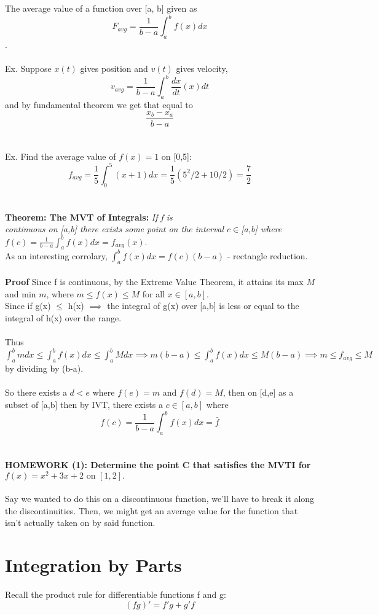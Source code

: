 \documentclass[twocolumn, 12pt]{report}
\begin{document}
  The average value of a function over [a, b] given as $$F_{avg} = \frac {1}{b-a} \int_a^b f(x)dx$$.\\\\ Ex. Suppose $x(t)$ gives position and $v(t)$ gives velocity, $$v_{avg} = \frac{1}{b-a} \int_a^b \frac{dx}{dt}(x) dt$$ and by fundamental theorem we get that equal to $$\frac{x_b-x_a}{b-a}$$ \\\\
  Ex. Find the average value of $f(x) = 1$ on [0,5]:
  $$f_{avg} = \frac{1}{5} \int_0^5 (x+1) dx = \frac{1}{5} (5^2/2 + 10/2) = \frac{7}{2}$$ \\\\
  \textbf{Theorem: The MVT of Integrals:} \textit{ If f is \\continuous on [a,b] there exists some point on the interval $c\in$[a,b] where $f(c) = \frac{1}{b-a} \int_a^b f(x)dx = f_{avg}(x)$}. \\ As an interesting corrolary, $\int_a^b f(x)dx = f(c)(b-a)$ - rectangle reduction.
  \\\\
  \textbf{Proof} Since f is continuous, by the Extreme Value Theorem, it attains its max $M$ and min $m$, where $ m \leq f(x) \leq M$ for all $x \in [a,b]$. \\ Since if g(x) $\leq$ h(x) $\implies$ the integral of g(x) over [a,b] is less or equal to the integral of h(x) over the range. \\\\Thus $\int_a^b m dx \leq \int_a^b f(x) dx \leq \int_a^b M dx \implies m(b-a) \leq \int_a^b f(x) dx \leq M (b-a) \implies m \leq f_{avg} \leq M$ by dividing by (b-a). \\\\
  So there exists a $d < e$ where $f(e) = m$ and $f(d) = M$, then on [d,e] as a subset of [a,b] then by IVT, there exists a $c \in [a,b]$ where $$f(c) = \frac{1}{b-a}\int_a^b f(x)dx = \bar{f}$$\\\\

   \textbf{HOMEWORK (1): Determine the point C that satisfies the MVTI for $f(x) = x^2 + 3x + 2 \text{ on } [1,2].$}\\\\ Say we wanted to do this on a discontinuous function, we'll have to break it along the discontinuities. Then, we might get an average value for the function that isn't actually taken on by said function.
  \section{Integration by Parts}
  Recall the product rule for differentiable functions f and g:
  $$(fg)' = f'g + g'f$$
\end{document}
